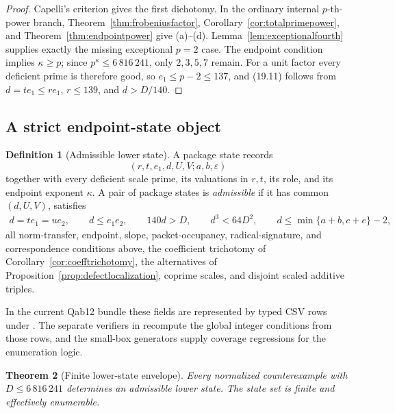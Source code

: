 \documentclass[11pt]{article}
\newtheorem{theorem}{Theorem}[section]
\theoremstyle{definition}
\newtheorem{definition}[theorem]{Definition}
\begin{document}
\begin{proof}
Capelli's criterion gives the first dichotomy.  In the ordinary internal
\(p\)-th-power branch, Theorem~\ref{thm:frobeniusfactor},
Corollary~\ref{cor:totalprimepower}, and Theorem~\ref{thm:endpointpower}
give (a)--(d).  Lemma~\ref{lem:exceptionalfourth} supplies exactly the
missing exceptional \(p=2\) case.  The endpoint condition implies
\(\kappa\geq p\); since \(p^\kappa\leq6\,816\,241\), only
\(2,3,5,7\) remain.  For a unit factor every deficient prime is therefore
good, so \(e_1\leq p-2\leq137\), and (19.11) follows from
\(d=te_1\leq re_1\), \(r\leq139\), and \(d>D/140\).
\end{proof}

\subsection{A strict endpoint-state object}

\begin{definition}[Admissible lower state]\label{def:endpointstate}
A package state records
\[
 (r,t,e_1,d,U,V;a,b,\varepsilon)
\]
together with every deficient scale prime, its valuations in \(r,t\), its
role, and its endpoint exponent \(\kappa\).  A pair of package states is
\emph{admissible} if it has common \((d,U,V)\), satisfies
\begin{gather*}
 d=te_1=ue_2,\qquad d\leq e_1e_2,
 \qquad 140d>D,
 \qquad d^3<64D^2,
 \qquad d\leq\min\{a+b,c+e\}-2,\tag{19.12}
\end{gather*}
all norm-transfer, endpoint, slope, packet-occupancy, radical-signature, and
correspondence conditions above, the coefficient trichotomy of
Corollary~\ref{cor:coefftrichotomy}, the alternatives of
Proposition~\ref{prop:defectlocalization}, coprime scales, and disjoint scaled
additive triples.
\end{definition}

In the current Qab12 bundle these fields are represented by typed CSV rows
under .  The separate verifiers in 
recompute the global integer conditions from those rows, and the small-box
generators supply coverage regressions for the enumeration logic.

\begin{theorem}[Finite lower-state envelope]\label{thm:lowerstatereduction}
Every normalized counterexample with \(D\leq6\,816\,241\) determines an
admissible lower state.  The state set is finite and effectively enumerable.
\end{theorem}
\end{document}
